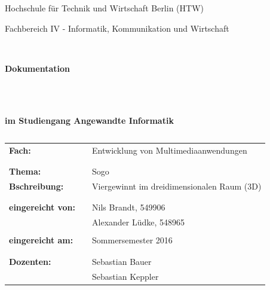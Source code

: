 \documentclass[a4paper]{scrartcl}
\begin{document}
\renewcommand\lstlistingname{Quellcode}	%
%
%
\thispagestyle{empty}

\begin{center}
\Large{Hochschule für Technik und Wirtschaft Berlin (HTW)}\\
\end{center}
 
 
\begin{center}
\Large{Fachbereich IV - Informatik, Kommunikation und Wirtschaft}
\end{center}
\begin{verbatim}


\end{verbatim}
\begin{center}
\textbf{\LARGE{Dokumentation}}
\end{center}
\begin{verbatim}
 
 
\end{verbatim}
\begin{center}
\textbf{im Studiengang Angewandte Informatik}
\end{center}
\begin{verbatim}
\end{verbatim}
 
\begin{tabular}{lll}
\textbf{Fach:} & & Entwicklung von Multimediaanwendungen\\
& & \\
& & \\
\textbf{Thema:} & & Sogo\\
\textbf{Bschreibung:}& & Viergewinnt im dreidimensionalen Raum (3D) \\
& & \\
& & \\
\textbf{eingereicht von:} & & Nils Brandt, 549906 \\
& & Alexander Lüdke, 548965 \\
& & \\
\textbf{eingereicht am:} & &  Sommersemester 2016 \\
& & \\
& & \\
\textbf{Dozenten:} & & Sebastian Bauer \\
& & 	Sebastian Keppler
\end{tabular}
\end{document}
